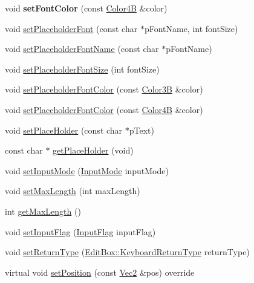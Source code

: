 \begin{DoxyCompactItemize}
\mbox{\label{classui_1_1EditBox_acd7aa1527813c463ab4bbb955ba8d528}} 
void {\bfseries set\+Font\+Color} (const \hyperlink{structColor4B}{Color4B} \&color)
\item 
void \hyperlink{classui_1_1EditBox_a19ef30f768dcf5d67808e0e67b7809b9}{set\+Placeholder\+Font} (const char $\ast$p\+Font\+Name, int font\+Size)
\item 
void \hyperlink{classui_1_1EditBox_a7d5130331ff087d3b0544cac2939a55b}{set\+Placeholder\+Font\+Name} (const char $\ast$p\+Font\+Name)
\item 
void \hyperlink{classui_1_1EditBox_a8460f548f82512af8286b384a8c8bcab}{set\+Placeholder\+Font\+Size} (int font\+Size)
\item 
void \hyperlink{classui_1_1EditBox_a84cdeb802d3ab4e78c036d49a2ffefed}{set\+Placeholder\+Font\+Color} (const \hyperlink{structColor3B}{Color3B} \&color)
\item 
void \hyperlink{classui_1_1EditBox_a29ddb4a951ce3cd8c2946ed13cf4c2ee}{set\+Placeholder\+Font\+Color} (const \hyperlink{structColor4B}{Color4B} \&color)
\item 
void \hyperlink{classui_1_1EditBox_a89c526a2899c99ff09bd9fb6e435e799}{set\+Place\+Holder} (const char $\ast$p\+Text)
\item 
const char $\ast$ \hyperlink{classui_1_1EditBox_a47a20f50cb56438d96a87a60219fdce9}{get\+Place\+Holder} (void)
\item 
void \hyperlink{classui_1_1EditBox_ad1b58227c6cf26800613983688c82066}{set\+Input\+Mode} (\hyperlink{classui_1_1EditBox_a7a1bfe8f3ba218bedfcf5451ec3ce01a}{Input\+Mode} input\+Mode)
\item 
void \hyperlink{classui_1_1EditBox_a7f9fd5527404e0dc6e98e23a661325b4}{set\+Max\+Length} (int max\+Length)
\item 
int \hyperlink{classui_1_1EditBox_acd8e23e5b2db7c3b27a8e7cf9ce320c3}{get\+Max\+Length} ()
\item 
void \hyperlink{classui_1_1EditBox_ab76860616e5d9d7b1601e2a203a8c82a}{set\+Input\+Flag} (\hyperlink{classui_1_1EditBox_af02f13ee9fba51d59bb3111e200848c8}{Input\+Flag} input\+Flag)
\item 
void \hyperlink{classui_1_1EditBox_ae2f5a317a5b3bb4b1212cf3a44770e6d}{set\+Return\+Type} (\hyperlink{classui_1_1EditBox_a1e1285b6f742975b26bdeb8108ca6e51}{Edit\+Box\+::\+Keyboard\+Return\+Type} return\+Type)
\item 
virtual void \hyperlink{classui_1_1EditBox_a9920fc994750f83db1c80be0417143f6}{set\+Position} (const \hyperlink{classVec2}{Vec2} \&pos) override

\end{DoxyCompactItemize}
